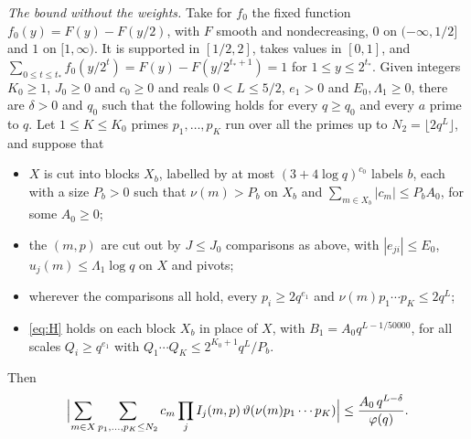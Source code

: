 \documentclass[11pt]{article}
\numberwithin{equation}{section}
\begin{document}
\emph{The bound without the weights.} Take for $f_0$ the fixed function $f_0(y) = F(y) - F(y/2)$, with $F$ smooth and
nondecreasing, $0$ on $(-\infty, 1/2]$ and $1$ on $[1, \infty)$. It is supported in $[1/2, 2]$, takes values in $[0,
1]$, and $\sum_{0 \le t \le t_*} f_0(y/2^t) = F(y) - F(y/2^{t_* + 1}) = 1$ for $1 \le y \le 2^{t_*}$. Given integers
$K_0 \ge 1$, $J_0 \ge 0$ and $c_0 \ge 0$ and reals $0 < L \le 5/2$, $e_1 > 0$ and $E_0, \Lambda_1 \ge 0$, there are
$\delta > 0$ and $q_0$ such that the following holds for every $q \ge q_0$ and every $a$ prime to $q$. Let $1 \le K \le
K_0$ primes $p_1, \dots, p_K$ run over all the primes up to $N_2 = \lfloor 2q^L \rfloor$, and suppose that
\begin{itemize}
\item $X$ is cut into blocks $X_b$, labelled by at most $(3 + 4 \log q)^{c_0}$ labels $b$, each with a size $P_b > 0$
  such that $\nu(m) > P_b$ on $X_b$ and $\sum_{m \in X_b} |c_m| \le P_b A_0$, for some $A_0 \ge 0$;
\item the $(m, p)$ are cut out by $J \le J_0$ comparisons as above, with $|e_{ji}| \le E_0$, $u_j(m) \le \Lambda_1
  \log q$ on $X$ and pivots;
\item wherever the comparisons all hold, every $p_i \ge 2q^{e_1}$ and $\nu(m) p_1 \cdots p_K \le 2q^L$;
\item \eqref{eq:H} holds on each block $X_b$ in place of $X$, with $B_1 = A_0 q^{L - 1/50000}$, for all scales $Q_i
  \ge q^{e_1}$ with $Q_1 \cdots Q_K \le 2^{K_0 + 1} q^L/P_b$.
\end{itemize}
Then
\begin{equation}\label{eq:fam-unw}
  \Bigl|\sum_{m \in X} \sum_{p_1, \dots, p_K \le N_2} c_m \prod_j I_j(m, p) \, \vartheta(\nu(m) p_1 \cdots p_K)\Bigr|
  \le \frac{A_0 \, q^{L - \delta}}{\varphi(q)}.
\end{equation}
\end{document}
